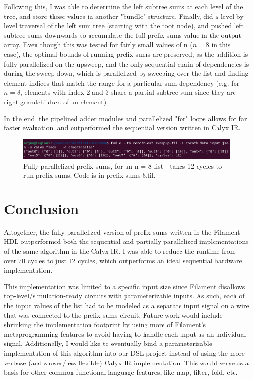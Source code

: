 \documentclass[12pt]{article}
\begin{document}
Following this, I was able to determine the left subtree sums at each level of the tree, and store those values in another "bundle" structure. Finally,
did a level-by-level traversal of the left sum tree (starting with the root node), and pushed left subtree sums downwards to accumulate the full
prefix sums value in the output array. Even though this was tested for fairly small values of n ($n = 8$ in this case), the optimal bounds of running prefix
sums are preserved, as the addition is fully parallelized on the upsweep, and the only sequential chain of dependencies is during the sweep down,
which is parallelized by sweeping over the list and finding element indices that match the range for a particular sum dependency (e.g. for $n = 8$,
elements with index 2 and 3 share a partial subtree sum since they are right grandchildren of an element).

In the end, the pipelined adder modules and parallelized "for" loops allows for far faster evaluation, and outperformed the sequential version written in
Calyx IR.

\begin{figure}[H]
    \centering
    \includegraphics[width=\linewidth]{images/filament_prefix_sums.png}
    \caption{Fully parallelized prefix sums, for an n = 8 list - takes 12 cycles to run prefix sums. Code is in prefix-sums-8.fil.}
\end{figure}

\section{Conclusion}
Altogether, the fully parallelized version of prefix sums written in the Filament HDL outperformed
both the sequential and partially parallelized implementations of the same algorithm in the Calyx IR.
I was able to reduce the runtime from over 70 cycles to just 12 cycles, which outperforms an ideal sequential
hardware implementation.

This implementation was limited to a specific input size since Filament disallows top-level/simulation-ready
circuits with parameterizable inputs. As such, each of the input values of the list had to be modeled as a separate
input signal on a wire that was connected to the prefix sums circuit. Future work would include shrinking the implementation
footprint by using more of Filament's metaprogramming features to avoid having to handle each input as an individual signal.
Additionally, I would like to eventually bind a parameterizable implementation of this algorithm into our DSL project
instead of using the more verbose (and slower/less flexible) Calyx IR implementation. This would serve as a basis
for other common functional language features, like map, filter, fold, etc.
\end{document}
